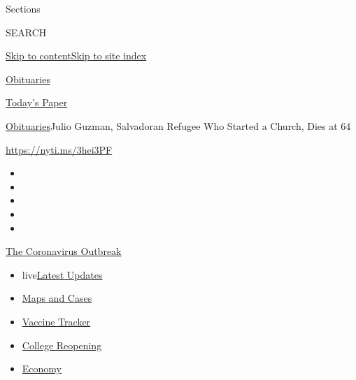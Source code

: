 Sections

SEARCH

\protect\hyperlink{site-content}{Skip to
content}\protect\hyperlink{site-index}{Skip to site index}

\href{https://www.nytimes3xbfgragh.onion/section/obituaries}{Obituaries}

\href{https://myaccount.nytimes3xbfgragh.onion/auth/login?response_type=cookie\&client_id=vi}{}

\href{https://www.nytimes3xbfgragh.onion/section/todayspaper}{Today's
Paper}

\href{/section/obituaries}{Obituaries}\textbar{}Julio Guzman, Salvadoran
Refugee Who Started a Church, Dies at 64

\url{https://nyti.ms/3hei3PF}

\begin{itemize}
\item
\item
\item
\item
\item
\end{itemize}

\href{https://www.nytimes3xbfgragh.onion/news-event/coronavirus?action=click\&pgtype=Article\&state=default\&region=TOP_BANNER\&context=storylines_menu}{The
Coronavirus Outbreak}

\begin{itemize}
\tightlist
\item
  live\href{https://www.nytimes3xbfgragh.onion/2020/08/04/world/coronavirus-covid-19.html?action=click\&pgtype=Article\&state=default\&region=TOP_BANNER\&context=storylines_menu}{Latest
  Updates}
\item
  \href{https://www.nytimes3xbfgragh.onion/interactive/2020/us/coronavirus-us-cases.html?action=click\&pgtype=Article\&state=default\&region=TOP_BANNER\&context=storylines_menu}{Maps
  and Cases}
\item
  \href{https://www.nytimes3xbfgragh.onion/interactive/2020/science/coronavirus-vaccine-tracker.html?action=click\&pgtype=Article\&state=default\&region=TOP_BANNER\&context=storylines_menu}{Vaccine
  Tracker}
\item
  \href{https://www.nytimes3xbfgragh.onion/2020/08/02/us/covid-college-reopening.html?action=click\&pgtype=Article\&state=default\&region=TOP_BANNER\&context=storylines_menu}{College
  Reopening}
\item
  \href{https://www.nytimes3xbfgragh.onion/live/2020/08/03/business/stock-market-today-coronavirus?action=click\&pgtype=Article\&state=default\&region=TOP_BANNER\&context=storylines_menu}{Economy}
\end{itemize}

